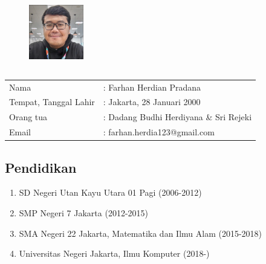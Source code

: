 \chapter*{}

\begin{figure}[H]
\centering
\includegraphics[height={120px}, width={90px}]{gambar/farhan}
\end{figure}

\noindent
\begin{tabular}{ll}
Nama & : Farhan Herdian Pradana \\
Tempat, Tanggal Lahir & : Jakarta, 28 Januari 2000 \\
Orang tua & : Dadang Budhi Herdiyana \& Sri Rejeki \\
Email & : farhan.herdia123@gmail.com
\end{tabular}

\section*{Pendidikan}
\begin{enumerate}
    \itemsep0em 
    \item SD Negeri Utan Kayu Utara 01 Pagi (2006-2012)
    \item SMP Negeri 7 Jakarta (2012-2015)
    \item SMA Negeri 22 Jakarta, Matematika dan Ilmu Alam (2015-2018)
    \item Universitas Negeri Jakarta, Ilmu Komputer (2018-)
\end{enumerate}


